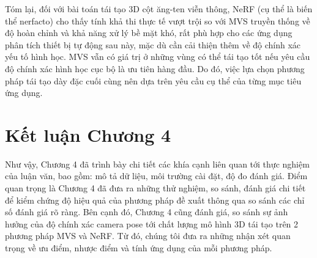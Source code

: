 Tóm lại, đối với bài toán tái tạo 3D cột ăng-ten viễn thông, NeRF (cụ thể là biến thể nerfacto) cho thấy tính khả thi thực tế vượt trội so với MVS truyền thống về độ hoàn chỉnh và khả năng xử lý bề mặt khó, rất phù hợp cho các ứng dụng phân tích thiết bị tự động sau này, mặc dù cần cải thiện thêm về độ chính xác yếu tố hình học. MVS vẫn có giá trị ở những vùng có thể tái tạo tốt nếu yêu cầu độ chính xác hình học cục bộ là ưu tiên hàng đầu. Do đó, việc lựa chọn phương pháp tái tạo dày đặc cuối cùng nên dựa trên yêu cầu cụ thể của từng mục tiêu ứng dụng.

\section*{Kết luận Chương 4}
Như vậy, Chương 4 đã trình bày chi tiết các khía cạnh liên quan tới thực nghiệm của luận văn, bao gồm: mô tả dữ liệu, môi trường cài đặt, độ đo đánh giá. Điểm quan trọng là Chương 4 đã đưa ra những thử nghiệm, so sánh, đánh giá chi tiết để kiểm chứng độ hiệu quả của phương pháp đề xuất thông qua so sánh các chỉ số đánh giá rõ ràng. Bên cạnh đó, Chương 4 cũng đánh giá, so sánh sự ảnh hưởng của độ chính xác camera pose tới chất lượng mô hình 3D tái tạo trên 2 phương pháp MVS và NeRF. Từ đó, chúng tôi đưa ra những nhận xét quan trọng về ưu điểm, nhược điểm và tính ứng dụng của mỗi phương pháp.